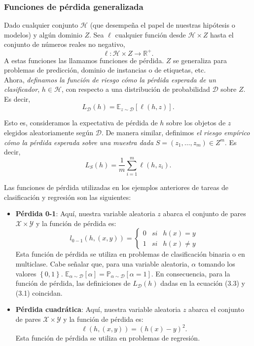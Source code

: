 \subsubsection{Funciones de pérdida generalizada}
Dado cualquier conjunto $\mathcal{H}$ (que desempeña el papel de nuestras hipótesis o modelos) y algún dominio $Z$. Sea $\ell$ cualquier función desde $\mathcal{H} \times Z$ hasta el conjunto de números reales no negativo, 
$$\ell:\mathcal{H}\times Z \to \mathbb{R}^+.$$ 
A estas funciones las llamamos funciones de pérdida. $Z$ se generaliza para problemas de predicción, dominio de instancias o de etiquetas, etc.\\

Ahora, \textit{definamos la función de riesgo cómo la pérdida esperada de un clasificador}, $h\in \mathcal{H}$, con respecto a una distribución de probabilidad $\mathcal{D}$ sobre $Z$. Es decir,
\begin{equation}
    L_{\mathcal{D}}(h) = \mathbb{E}_{z\sim \mathcal{D}}\left[\ell(h, z)\right].
\end{equation}

Esto es, consideramos la expectativa de pérdida de $h$ sobre los objetos de $z$ elegidos aleatoriamente según $\mathcal{D}$. De manera similar, definimos \textit{el riesgo empírico cómo la pérdida esperada sobre una muestra dada} $S=\left(z_1,\ldots,z_m\right)\in Z^m$. Es decir,
\begin{equation}
	L_S(h) = \dfrac{1}{m}\sum_{i=1}^m \ell(h, z_i).
\end{equation}

Las funciones de pérdida utilizadas en los ejemplos anteriores de tareas de clasificación y regresión son las siguientes:

\begin{itemize}
    \item \textbf{Pérdida 0-1}: Aquí, nuestra variable aleatoria $z$ abarca el conjunto de pares $\mathcal{X}\times \mathcal{Y}$ y la función de pérdida es:
	$$
	\mathit{l}_{0-1} \left(h, (x,y)\right) = \left\{
	    \begin{array}{rcl}
		0 & si & h(x)=y\\
		1 & si & h(x)\neq y
	    \end{array}
	\right.
	$$
    Esta función de pérdida se utiliza en problemas de clasificación binaria o en multiclase. Cabe señalar que, para una variable aleatoria, $\alpha$ tomando los valores $\left\{0,1\right\}$. $\mathbb{E}_{\alpha\sim \mathcal{D}}[\alpha]=\mathbb{P}_{\alpha\sim \mathcal{D}}[\alpha=1]$. En consecuencia, para la función de pérdida, las definiciones de $L_{\mathcal{D}}(h)$ dadas en la ecuación (3.3) y (3.1) coincidan.
    \item \textbf{Pérdida cuadrática}: Aquí, nuestra variable aleatoria $z$ abarca el conjunto de pares $\mathcal{X}\times \mathcal{Y}$ y la función de pérdida es:
	$$\ell\left(h,(x,y)\right) = \left(h(x)-y\right)^2.$$
    Esta función de pérdida se utiliza en problemas de regresión.
\end{itemize}


